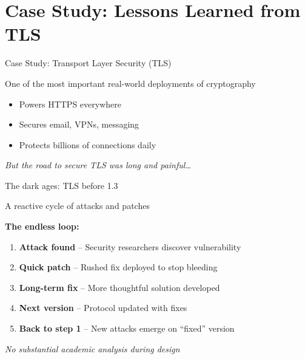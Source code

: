 \documentclass[aspectratio=169, lualatex, handout]{beamer}
\begin{document}
\section{Case Study: Lessons Learned from TLS}

\begin{frame}{Case Study: Transport Layer Security (TLS)}
	\begin{center}
		\Large
		One of the most important real-world deployments of cryptography
	\end{center}
	\vspace{1em}
	\begin{itemize}
		\item Powers HTTPS everywhere
		\item Secures email, VPNs, messaging
		\item Protects billions of connections daily
	\end{itemize}
	\vspace{1em}
	\begin{center}
		\textit{But the road to secure TLS was long and painful\ldots}
	\end{center}
\end{frame}

\begin{frame}{The dark ages: TLS before 1.3}
	\begin{center}
		\Large
		A reactive cycle of attacks and patches
	\end{center}
	\vspace{1em}
	\textbf{The endless loop:}
	\begin{enumerate}
		\item \textbf{Attack found} -- Security researchers discover vulnerability
		\item \textbf{Quick patch} -- Rushed fix deployed to stop bleeding
		\item \textbf{Long-term fix} -- More thoughtful solution developed
		\item \textbf{Next version} -- Protocol updated with fixes
		\item \textbf{Back to step 1} -- New attacks emerge on ``fixed'' version
	\end{enumerate}
	\vspace{0.5em}
	\begin{center}
		\textit{No substantial academic analysis during design}
	\end{center}
\end{frame}
\end{document}
